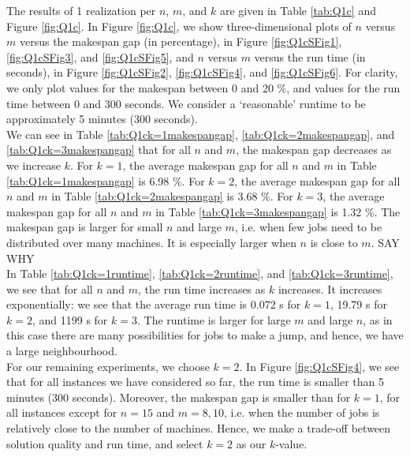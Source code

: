 \documentclass[12pt,a4paper,reqno]{article}
\begin{document}
The results of 1 realization per $n$, $m$, and $k$ are given in Table \ref{tab:Q1c} and Figure \ref{fig:Q1c}.
In Figure \ref{fig:Q1c}, we show three-dimensional plots of $n$ versus $m$ versus the makespan gap (in percentage), in Figure \ref{fig:Q1cSFig1}, \ref{fig:Q1cSFig3}, and \ref{fig:Q1cSFig5}, and $n$ versus $m$ versus the run time (in seconds), in Figure \ref{fig:Q1cSFig2}, \ref{fig:Q1cSFig4}, and \ref{fig:Q1cSFig6}. For clarity, we only plot values for the makespan between 0 and 20 \%, and values for the run time between 0 and 300 seconds. We consider a `reasonable' runtime to be approximately 5 minutes (300 seconds). \\

We can see in Table \ref{tab:Q1ck=1makespangap}, \ref{tab:Q1ck=2makespangap}, and \ref{tab:Q1ck=3makespangap} that for all $n$ and $m$, the makespan gap decreases as we increase $k$. For $k=1$, the average makespan gap for all $n$ and $m$ in Table \ref{tab:Q1ck=1makespangap} is 6.98 \%. For $k=2$,  the average makespan gap for all $n$ and $m$ in Table \ref{tab:Q1ck=2makespangap} is 3.68 \%. For $k=3$,  the average makespan gap for all $n$ and $m$ in Table \ref{tab:Q1ck=3makespangap} is 1.32 \%. The makespan gap is larger for small $n$ and large $m$, i.e. when few jobs need to be distributed over many machines. It is especially larger when $n$ is close to $m$. \color{red} SAY WHY \color{black} \\

In Table  \ref{tab:Q1ck=1runtime}, \ref{tab:Q1ck=2runtime}, and \ref{tab:Q1ck=3runtime}, we see that for all $n$ and $m$, the run time increases as $k$ increases. It increases exponentially: we see that the average run time is 0.072 s for $k=1$, 19.79 s for $k=2$, and 1199 s for $k=3$. The runtime is larger for large $m$ and large $n$, as in this case there are many possibilities for jobs to make a jump, and hence, we have a large neighbourhood. \\

For our remaining experiments, we choose $k=2$. In Figure \ref{fig:Q1cSFig4}, we see that for all instances we have considered so far, the run time is smaller than 5 minutes (300 seconds). Moreover, the makespan gap is smaller than for $k=1$, for all instances except for $n=15$ and $m=8,10$, i.e. when the number of jobs is relatively close to the number of machines. Hence, we make a trade-off between solution quality and run time, and select $k=2$ as our $k$-value.
\end{document}

